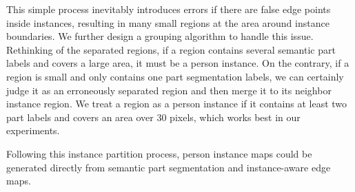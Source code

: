 \documentclass[runningheads]{llncs}
\begin{document}
This simple process inevitably introduces errors if there are false edge points inside instances, resulting in many small regions at the area around instance boundaries. We further design a grouping algorithm to handle this issue. Rethinking of the separated regions, if a region contains several semantic part labels and covers a large area, it must be a person instance. On the contrary, if a region is small and only contains one part segmentation labels, we can certainly judge it as an erroneously separated region and then merge it to its neighbor instance region. We treat a region as a person instance if it contains at least two part labels and covers an area over 30 pixels, which works best in our experiments.

Following this instance partition process, person instance maps could be generated directly from semantic part segmentation and instance-aware edge maps.
\end{document}
